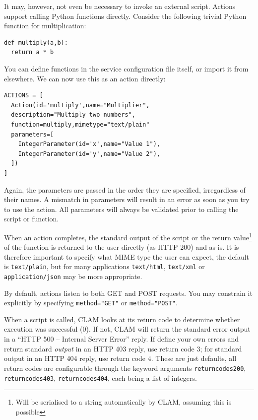 \documentclass[a4paper,12pt,twoside,openright]{report}
\begin{document}
It may, however, not even be necessary to invoke an external script. Actions
support calling Python functions directly. Consider the following trivial Python
function for multiplication:

{ \small
\begin{verbatim}
def multiply(a,b):
  return a * b
\end{verbatim}
}

You can define functions in the service configuration file itself, or import it
from elsewhere. We can now use this as an action directly:

{ \small
\begin{verbatim}
ACTIONS = [
  Action(id='multiply',name="Multiplier",
  description="Multiply two numbers",
  function=multiply,mimetype="text/plain"
  parameters=[
    IntegerParameter(id='x',name="Value 1"),
    IntegerParameter(id='y',name="Value 2"),
  ])
]
\end{verbatim}
}

Again, the parameters are passed in the order they are specified, irregardless
of their names. A mismatch in parameters will result in an error as soon as you
try to use the action. All parameters will always be validated prior to calling the
script or function.

When an action completes, the standard output of the script or the return
value\footnote{Will be serialised to a string automatically by CLAM, assuming
this is possible} of the function is returned to the user directly (as HTTP 200) and as-is.
It is therefore important to specify what MIME type the user can expect, the
default is \texttt{text/plain}, but for many applications \texttt{text/html}, \texttt{text/xml} or
\texttt{application/json} may be more appropriate.

By default, actions listen to both GET and POST requests. You may constrain it
explicitly by specifying \texttt{method="GET"} or \texttt{method="POST"}.

When a script is called, CLAM looks at its return code to determine whether
execution was successful ($0$). If not, CLAM will return the standard error
output in a ``HTTP 500 -- Internal Server Error'' reply. If define your own
errors and return standard \emph{output} in an HTTP 403 reply, use return code
$3$; for standard output in an HTTP 404 reply, use return code $4$. These are just defaults, all return
codes are configurable through the keyword arguments \texttt{returncodes200},
\texttt{returncodes403}, \texttt{returncodes404}, each being a list of
integers.
\end{document}
